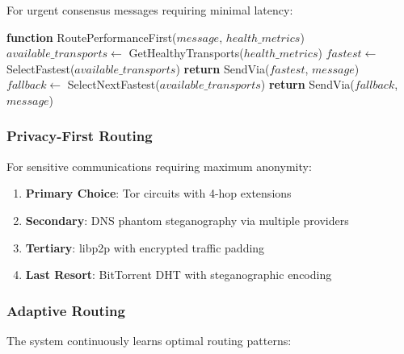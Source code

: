 \documentclass[11pt,a4paper]{article}
\theoremstyle{definition}
\theoremstyle{remark}
\begin{document}
For urgent consensus messages requiring minimal latency:

\begin{algorithm}
\caption{Performance-First Message Routing}
\begin{algorithmic}[1]
\STATE \textbf{function} RoutePerformanceFirst($message$, $health\_metrics$)
\STATE $available\_transports \leftarrow$ GetHealthyTransports($health\_metrics$)
\STATE $fastest \leftarrow$ SelectFastest($available\_transports$)
    \STATE \textbf{return} SendVia($fastest$, $message$)
\ELSE
    \STATE $fallback \leftarrow$ SelectNextFastest($available\_transports$)
    \STATE \textbf{return} SendVia($fallback$, $message$)
\ENDIF
\end{algorithmic}
\end{algorithm}

\subsubsection{Privacy-First Routing}

For sensitive communications requiring maximum anonymity:

\begin{enumerate}
    \item \textbf{Primary Choice}: Tor circuits with 4-hop extensions
    \item \textbf{Secondary}: DNS phantom steganography via multiple providers
    \item \textbf{Tertiary}: libp2p with encrypted traffic padding
    \item \textbf{Last Resort}: BitTorrent DHT with steganographic encoding
\end{enumerate}

\subsubsection{Adaptive Routing}

The system continuously learns optimal routing patterns:
\end{document}
